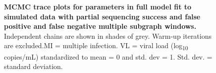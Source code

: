 \documentclass[10pt,letterpaper]{article}
\begin{document}
\begin{figure}[!ht]
\caption{{\bf MCMC trace plots for parameters in full model fit to simulated data with partial sequencing success and false positive and false negative multiple subgraph windows.} Independent chains are shown in shades of grey. Warm-up iterations are excluded.MI = multiple infection. VL = viral load (log\textsubscript{10} copies/mL) standardized to mean = 0 and std. dev = 1. Std. dev. = standard deviation. }
\end{figure}
\end{document}
